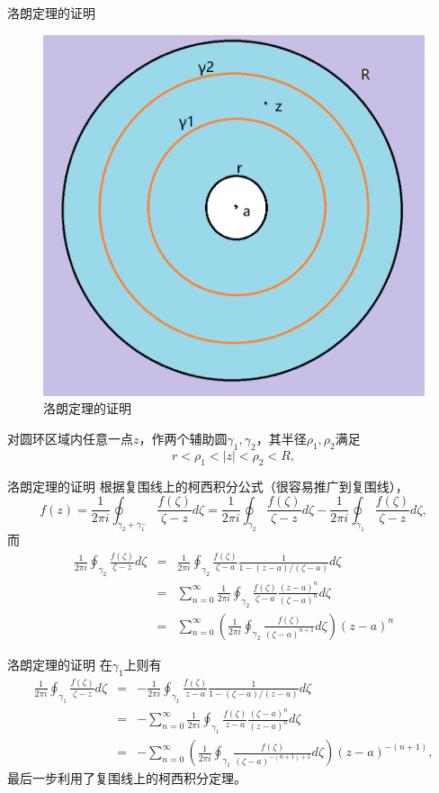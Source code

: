 \documentclass[11pt]{beamer}
\begin{document}
\begin{frame}{洛朗定理的证明}
\begin{figure}
	\centering
	\includegraphics[width=0.4\linewidth]{洛朗定理}
	\caption{洛朗定理的证明}
	\label{fig:}
\end{figure}
对圆环区域内任意一点$z$，作两个辅助圆$\gamma_1, \gamma_2$，其半径$\rho_1, \rho_2$满足
\begin{equation}
r < \rho_1 < |z| < \rho_2 < R,
\end{equation}
\end{frame}

\begin{frame}{洛朗定理的证明}
根据复围线上的柯西积分公式（很容易推广到复围线），
\begin{equation}
f(z) = \frac{1}{2 \pi i} \oint_{\gamma_2 + \gamma^-_1} \frac{f(\zeta)}{\zeta - z} d \zeta
= \frac{1}{2 \pi i} \oint_{\gamma_2} \frac{f(\zeta)}{\zeta - z} d \zeta
-\frac{1}{2 \pi i} \oint_{\gamma_1} \frac{f(\zeta)}{\zeta - z} d \zeta, 
\end{equation}
而
\begin{eqnarray}
\frac{1}{2 \pi i} \oint_{\gamma_2} \frac{f(\zeta)}{\zeta - z} d \zeta 
&=& \frac{1}{2 \pi i} \oint_{\gamma_2} \frac{f(\zeta)}{\zeta - a} \frac{1}{1-(z-a)/(\zeta-a)} d \zeta
\nonumber \\ 
&=& \sum_{n=0}^{\infty}\frac{1}{2 \pi i} \oint_{\gamma_2} \frac{f(\zeta)}{\zeta - a} \frac{(z-a)^n}{(\zeta-a)^n} d \zeta
\nonumber \\
&=& \sum_{n=0}^{\infty} ( \frac{1}{2 \pi i} \oint_{\gamma_2} \frac{f(\zeta)}{(\zeta - a)^{n+1}} d \zeta ) (z-a)^n
\end{eqnarray}
\end{frame}

\begin{frame}{洛朗定理的证明}
在$\gamma_1$上则有
\begin{eqnarray}
\frac{1}{2 \pi i} \oint_{\gamma_1} \frac{f(\zeta)}{\zeta - z} d \zeta 
&=& - \frac{1}{2 \pi i} \oint_{\gamma_1} \frac{f(\zeta)}{z - a} \frac{1}{1-(\zeta-a)/(z-a)} d \zeta
\nonumber \\ 
&=& - \sum_{n=0}^{\infty}\frac{1}{2 \pi i} \oint_{\gamma_1} \frac{f(\zeta)}{z - a} \frac{(\zeta-a)^n}{(z-a)^n} d \zeta
\nonumber \\
&=& - \sum_{n=0}^{\infty} ( \frac{1}{2 \pi i} \oint_{\gamma_1} \frac{f(\zeta)}{(\zeta - a)^{-(n+1) +1}} d \zeta ) (z-a)^{-(n+1)},
\end{eqnarray}
最后一步利用了复围线上的柯西积分定理。
\end{frame}
\end{document}
